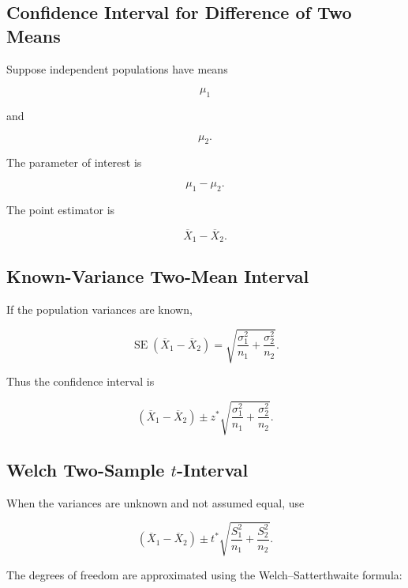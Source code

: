 \subsection{Confidence Interval for Difference of Two Means}
\label{subsec:ci-difference-two-means}

Suppose independent populations have means

\[
\mu_1
\]

and

\[
\mu_2.
\]

The parameter of interest is

\[
\boxed{
\mu_1-\mu_2.
}
\]

The point estimator is

\[
\boxed{
\overline{X}_1-\overline{X}_2.
}
\]

\subsection{Known-Variance Two-Mean Interval}
\label{subsec:known-variance-two-mean-ci}

If the population variances are known,

\[
\boxed{
\operatorname{SE}
(
\overline{X}_1-\overline{X}_2
)
=
\sqrt{
\frac{
\sigma_1^2
}{
n_1
}
+
\frac{
\sigma_2^2
}{
n_2
}
}.
}
\]

Thus the confidence interval is

\[
\boxed{
(\overline{X}_1-\overline{X}_2)
\pm
z^*
\sqrt{
\frac{
\sigma_1^2
}{
n_1
}
+
\frac{
\sigma_2^2
}{
n_2
}
}.
}
\]

\subsection{Welch Two-Sample \(t\)-Interval}
\label{subsec:welch-two-sample-ci}

When the variances are unknown and not assumed equal, use

\[
\boxed{
(\overline{X}_1-\overline{X}_2)
\pm
t^*
\sqrt{
\frac{
S_1^2
}{
n_1
}
+
\frac{
S_2^2
}{
n_2
}
}.
}
\]

The degrees of freedom are approximated using the
Welch--Satterthwaite formula:

